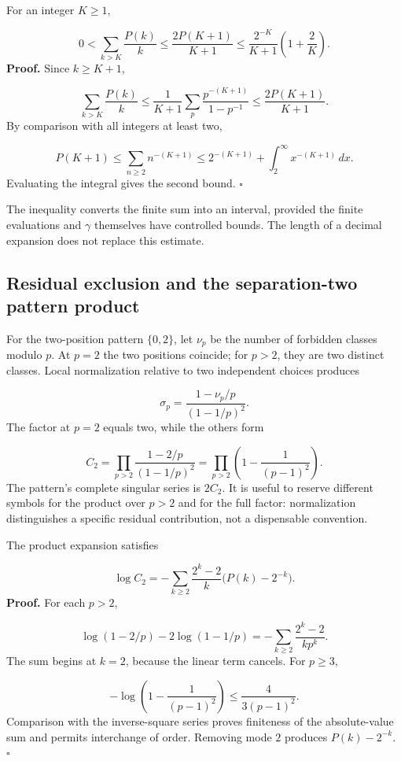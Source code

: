 For an integer $K\ge1$,

\[
0<\sum_{k>K}\frac{P(k)}k
\le\frac{2P(K+1)}{K+1}
\le\frac{2^{-K}}{K+1}\left(1+\frac2K\right).
\]
\textbf{Proof.} Since $k\ge K+1$,

\[
\sum_{k>K}\frac{P(k)}k
\le\frac1{K+1}\sum_p\frac{p^{-(K+1)}}{1-p^{-1}}
\le\frac{2P(K+1)}{K+1}.
\]
By comparison with all integers at least two,

\[
P(K+1)\le\sum_{n\ge2}n^{-(K+1)}
\le2^{-(K+1)}+\int_2^\infty x^{-(K+1)}\,dx.
\]
Evaluating the integral gives the second bound. \hfill\(\square\)

The inequality converts the finite sum into an interval, provided the finite evaluations and $\gamma$ themselves have controlled bounds. The length of a decimal expansion does not replace this estimate.

\subsection{Residual exclusion and the separation-two pattern product}
For the two-position pattern \(\{0,2\}\), let $\nu_p$ be the number of forbidden classes modulo $p$. At $p=2$ the two positions coincide; for $p>2$, they are two distinct classes. Local normalization relative to two independent choices produces

\[
\sigma_p=\frac{1-\nu_p/p}{(1-1/p)^2}.
\]
The factor at $p=2$ equals two, while the others form

\[
C_2=\prod_{p>2}\frac{1-2/p}{(1-1/p)^2}
=\prod_{p>2}\left(1-\frac1{(p-1)^2}\right).
\]
The pattern's complete singular series is $2C_2$. It is useful to reserve different symbols for the product over $p>2$ and for the full factor: normalization distinguishes a specific residual contribution, not a dispensable convention.

The product expansion satisfies

\[
\log C_2=-\sum_{k\ge2}\frac{2^k-2}{k}\bigl(P(k)-2^{-k}\bigr).
\]
\textbf{Proof.} For each $p>2$,

\[
\log(1-2/p)-2\log(1-1/p)
=-\sum_{k\ge2}\frac{2^k-2}{kp^k}.
\]
The sum begins at $k=2$, because the linear term cancels. For \(p\ge3\),

\[
-\log\left(1-\frac1{(p-1)^2}\right)\le\frac4{3(p-1)^2}.
\]
Comparison with the inverse-square series proves finiteness of the absolute-value sum and permits interchange of order. Removing mode $2$ produces $P(k)-2^{-k}$. \hfill\(\square\)

